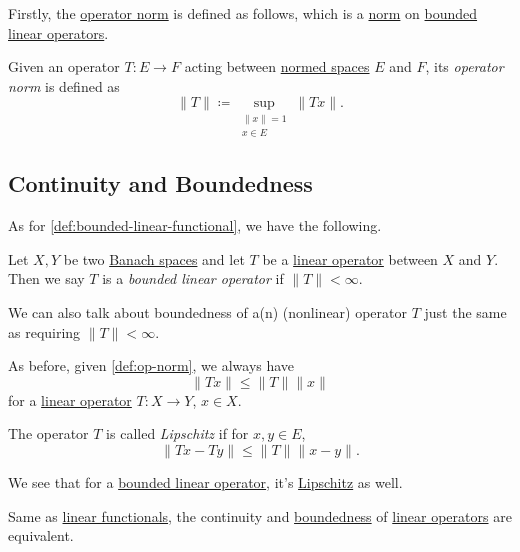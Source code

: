 Firstly, the \hyperref[def:op-norm]{operator norm} is defined as follows, which is a \hyperref[def:norm]{norm} on \hyperref[def:bounded-linear-op]{bounded linear operators}.

\begin{definition}\label{def:op-norm}
	Given an operator \(T\colon E \to F\) acting between \hyperref[def:normed-vector-space]{normed spaces} \(E\) and \(F\), its \emph{operator norm} is defined as
	\[
		\lVert T\rVert \coloneqq \sup _{\substack{\lVert x\rVert = 1 \\ x\in E}} \lVert Tx\rVert.
	\]
\end{definition}

\subsection{Continuity and Boundedness}
As for \autoref{def:bounded-linear-functional}, we have the following.

\begin{definition*}\label{def:bounded-linear-op}
	Let \(X, Y\) be two \hyperref[def:Banach-space]{Banach spaces} and let \(T\) be a \hyperref[def:linear-op]{linear operator} between \(X\) and \(Y\). Then we say \(T\) is a \emph{bounded linear operator} if \(\lVert T\rVert < \infty \).
\end{definition*}

\begin{remark}\label{rmk:bounded-op}
	We can also talk about boundedness of a(n) (nonlinear) operator \(T\) just the same as requiring \(\lVert T\rVert < \infty \).
\end{remark}

As before, given \autoref{def:op-norm}, we always have
\[
	\lVert Tx\rVert \leq \lVert T\rVert \lVert x\rVert
\]
for a \hyperref[def:linear-op]{linear operator} \(T\colon X\to Y\), \(x\in X\).

\begin{definition}[Lipschitz]\label{def:Lipschitz}
	The operator \(T\) is called \emph{Lipschitz} if for \(x, y\in E\),
	\[
		\lVert Tx - Ty\rVert \leq \lVert T\rVert \lVert x - y\rVert.
	\]
\end{definition}

We see that for a \hyperref[def:bounded-linear-op]{bounded linear operator}, it's \hyperref[def:Lipschitz]{Lipschitz} as well.

\begin{remark}
	Same as \hyperref[def:linear-functional]{linear functionals}, the continuity and \hyperref[def:bounded-linear-op]{boundedness} of \hyperref[def:linear-op]{linear operators} are equivalent.
\end{remark}

